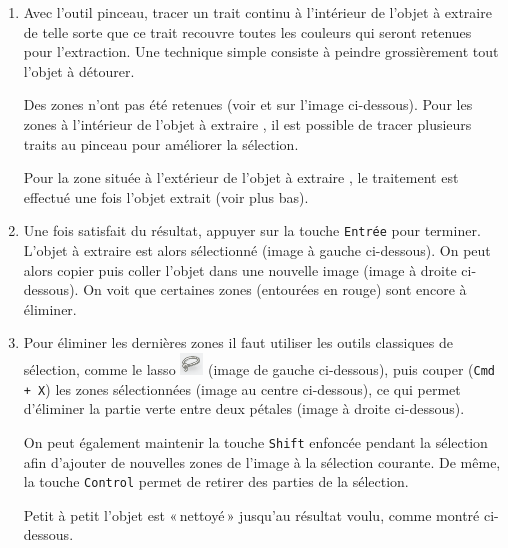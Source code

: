 \begin{enumerate}
\item Avec l'outil pinceau, tracer un trait continu à l'intérieur de l'objet à extraire de telle sorte que ce trait recouvre toutes les couleurs qui seront retenues pour l'extraction. Une technique simple consiste à peindre grossièrement tout l'objet à détourer.

\vspace{6pt}

Des zones n'ont pas été retenues (voir  et  sur l'image ci-dessous). Pour les zones à l'intérieur de l'objet à extraire , il est possible de tracer plusieurs traits au pinceau pour améliorer la sélection.


Pour la zone située à l'extérieur de l'objet à extraire , le traitement est effectué une fois l'objet extrait (voir plus bas).


\item Une fois satisfait du résultat, appuyer sur la touche \texttt{Entrée} pour terminer. L'objet à extraire est alors sélectionné (image à gauche ci-dessous). On peut alors copier puis coller l'objet dans une nouvelle image (image à droite ci-dessous). On voit que certaines zones (entourées en rouge) sont encore à éliminer.


\item Pour éliminer les dernières zones il faut utiliser les outils classiques de sélection, comme le lasso \includegraphics[width=.7cm]{./images/image03/outilLasso} (image de gauche ci-dessous), puis couper (\texttt{Cmd + X}) les zones sélectionnées (image au centre ci-dessous), ce qui permet d'éliminer la partie verte entre deux pétales (image à droite ci-dessous).

\vspace{6pt}

On peut également maintenir la touche \texttt{Shift} enfoncée pendant la sélection afin d'ajouter de nouvelles zones de l'image à la sélection courante. De même, la touche \texttt{Control} permet de retirer des parties de la sélection.


Petit à petit l'objet est «\,nettoyé\,» jusqu'au résultat voulu, comme montré ci-dessous.


\end{enumerate}

